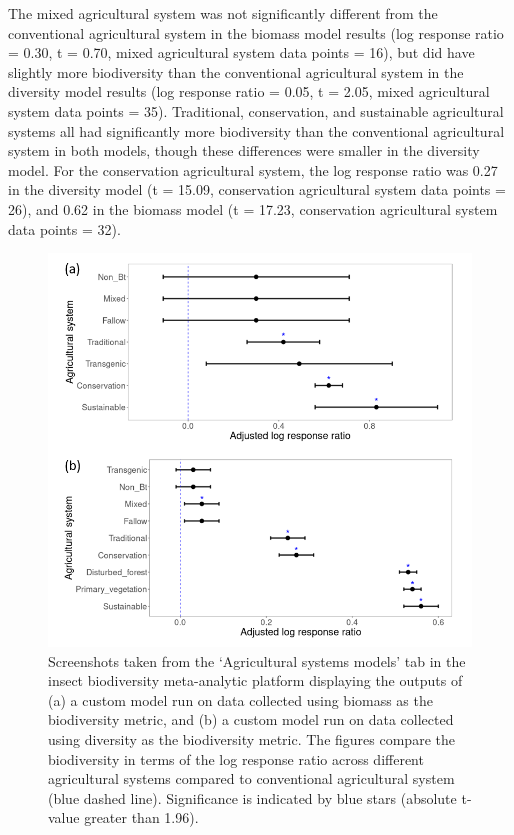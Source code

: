 \documentclass[11pt]{article}
\begin{document}
		\noindent The mixed agricultural system was not significantly different from the conventional agricultural system in the biomass model results (log response ratio = 0.30, t = 0.70, mixed agricultural system data points = 16), but did have slightly more biodiversity than the conventional agricultural system in the diversity model results (log response ratio = 0.05, t = 2.05, mixed agricultural system data points = 35). Traditional, conservation, and sustainable agricultural systems all had significantly more biodiversity than the conventional agricultural system in both models, though these differences were smaller in the diversity model. For the conservation agricultural system, the log response ratio was 0.27 in the diversity model (t = 15.09, conservation agricultural system data points = 26), and 0.62 in the biomass model (t = 17.23, conservation agricultural system data points = 32). 
		
		\begin{figure}[H] 
			\centering 
			\includegraphics[scale=1]{figure_4_diversity_vs_biomass_models.png} 
			\caption{Screenshots taken from the ‘Agricultural systems models’ tab in the insect biodiversity meta-analytic platform displaying the outputs of (a) a custom model run on data collected using biomass as the biodiversity metric, and (b) a custom model run on data collected using diversity as the biodiversity metric. The figures compare the biodiversity in terms of the log response ratio across different agricultural systems compared to conventional agricultural system (blue dashed line). Significance is indicated by blue stars (absolute t-value greater than 1.96).}  
		\end{figure}
		
\end{document}
